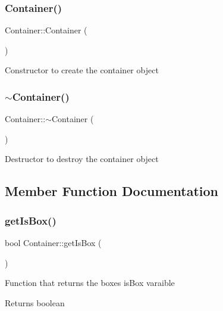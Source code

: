 \subsubsection{\texorpdfstring{Container()}{Container()}}
{\footnotesize\ttfamily Container\+::\+Container (\begin{DoxyParamCaption}{ }\end{DoxyParamCaption})}

Constructor to create the container object \mbox{\label{classContainer_ae9f5d07bfc3defda274aa06091c19f56}} 
\subsubsection{\texorpdfstring{$\sim$\+Container()}{~Container()}}
{\footnotesize\ttfamily Container\+::$\sim$\+Container (\begin{DoxyParamCaption}{ }\end{DoxyParamCaption})\hspace{0.3cm}{\ttfamily [virtual]}}

Destructor to destroy the container object 

\subsection{Member Function Documentation}
\mbox{\label{classContainer_a6b312784119e05843e1b4c4393054d77}} 
\subsubsection{\texorpdfstring{get\+Is\+Box()}{getIsBox()}}
{\footnotesize\ttfamily bool Container\+::get\+Is\+Box (\begin{DoxyParamCaption}{ }\end{DoxyParamCaption})}

Function that returns the boxes is\+Box varaible \begin{DoxyReturn}{Returns}
boolean 
\end{DoxyReturn}
\mbox{\label{classContainer_a0056752dea3f0d49dc085b0284d86ec5}} 
